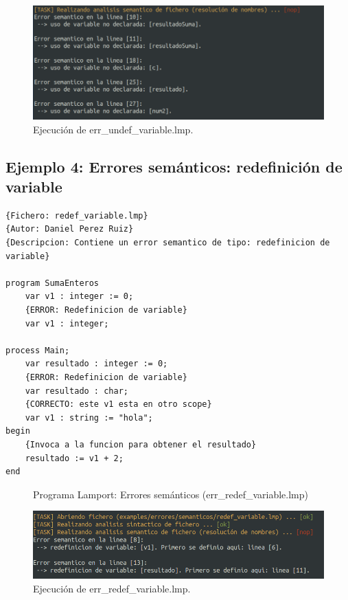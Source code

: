 \newpage
\begin{figure}[h]
    \includegraphics[width=\linewidth]{images/ejemplos/err_semantic/undef.png}
    \caption{Ejecución de err\_undef\_variable.lmp.}
    \label{fig:lamportErrSemanticUndef_exec}
\end{figure}

\newpage
\subsection{Ejemplo 4: Errores semánticos: redefinición de variable}
\begin{lstlisting}[style=lamportStyle]
{Fichero: redef_variable.lmp}
{Autor: Daniel Perez Ruiz}
{Descripcion: Contiene un error semantico de tipo: redefinicion de variable}

program SumaEnteros
	var v1 : integer := 0;
	{ERROR: Redefinicion de variable}
	var v1 : integer;

process Main;
	var resultado : integer := 0;
	{ERROR: Redefinicion de variable}
	var resultado : char;
	{CORRECTO: este v1 esta en otro scope}
	var v1 : string := "hola";
begin
	{Invoca a la funcion para obtener el resultado}
	resultado := v1 + 2;
end
\end{lstlisting}
\begin{figure}[h]
\caption{Programa Lamport: Errores semánticos (err\_redef\_variable.lmp)}
\label{fig:lamportErrSemanticRedef}
\end{figure}

\begin{figure}[h]
    \includegraphics[width=\linewidth]{images/ejemplos/err_semantic/redef.png}
    \caption{Ejecución de err\_redef\_variable.lmp.}
    \label{fig:lamportErrSemanticRedef_exec}
\end{figure}

